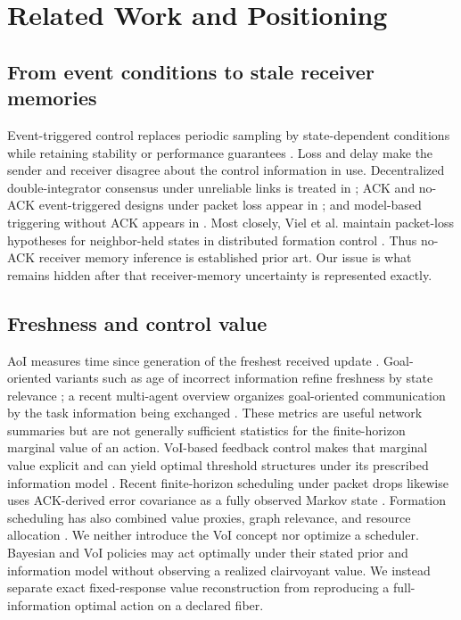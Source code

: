\documentclass[10pt,twocolumn,twoside]{IEEEtran}
\begin{document}
\section{Related Work and Positioning}

\subsection{From event conditions to stale receiver memories}

Event-triggered control replaces periodic sampling by state-dependent
conditions while retaining stability or performance guarantees
\cite{tabuada2007event,wang2011eventtriggering,dimarogonas2012distributed,
seyboth2013eventbased,nowzari2019eventtriggered}.  Loss and delay make the
sender and receiver disagree about the control information in use.
Decentralized double-integrator consensus under unreliable links is treated
in \cite{garcia2016unreliable}; ACK and no-ACK event-triggered designs under
packet loss appear in \cite{dolk2017packetlosses}; and model-based triggering
without ACK appears in \cite{garcia2021modelbasedlossy}.  Most closely, Viel
et al. maintain packet-loss hypotheses for neighbor-held states in distributed
formation control \cite{viel2022packetlossformation}.  Thus no-ACK receiver
memory inference is established prior art.  Our issue is what remains hidden
after that receiver-memory uncertainty is represented exactly.

\subsection{Freshness and control value}

AoI measures time since generation of the freshest received update
\cite{yates2021aoisurvey}.  Goal-oriented variants such as age of incorrect
information refine freshness by state relevance
\cite{maatouk2020aoii,rajaraman2021notjustage}; a recent multi-agent overview
organizes goal-oriented communication by the task information being exchanged
\cite{charalambous2026goaloriented}.  These metrics are useful
network summaries but are not generally sufficient statistics for the
finite-horizon marginal value of an action.  VoI-based feedback control makes
that marginal value explicit and can yield optimal threshold structures under
its prescribed information model \cite{soleymani2023voiglobal}.  Recent
finite-horizon scheduling under packet drops likewise uses ACK-derived error
covariance as a fully observed Markov state \cite{yang2026finitehorizon}.
Formation
scheduling has also combined value proxies, graph relevance, and resource
allocation \cite{chiariotti2025voiformation}.  We neither introduce the VoI
concept nor optimize a scheduler.  Bayesian and VoI policies may act optimally
under their stated prior and information model without observing a realized
clairvoyant value.  We instead separate exact fixed-response value
reconstruction from reproducing a full-information optimal action on a
declared fiber.
\end{document}

